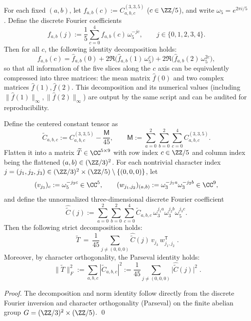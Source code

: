 \begin{remark}\label{prop:arity-335-fourier-fingerprint}
For each fixed $(a,b)$, let $f_{a,b}(c):=C^{(3,3,5)}_{a,b,c}$ ($c\in\ZZ/5$), and write $\omega_5=e^{2\pi i/5}$. Define the discrete Fourier coefficients
\[
\widehat f_{a,b}(j):=\frac15\sum_{c=0}^{4} f_{a,b}(c)\,\omega_5^{-jc},
\qquad j\in\{0,1,2,3,4\}.
\]
Then for all $c$, the following identity decomposition holds:
\[
f_{a,b}(c)
=\widehat f_{a,b}(0)
+2\Re\bigl(\widehat f_{a,b}(1)\,\omega_5^{c}\bigr)
+2\Re\bigl(\widehat f_{a,b}(2)\,\omega_5^{2c}\bigr),
\]
so that all information of the five slices along the $c$ axis can be equivalently compressed into three matrices: the mean matrix $\widehat f(0)$ and two complex matrices $\widehat f(1),\widehat f(2)$. This decomposition and its numerical values (including $\|\widehat f(1)\|_\infty,\|\widehat f(2)\|_\infty$) are output by the same script and can be audited for reproducibility.
\end{remark}

\begin{theorem}[Character decomposition \texorpdfstring{$\Rightarrow$}{=>} low-rank mechanism: rank-one outer product decomposition and Parseval energy identity for \texorpdfstring{$((3,3,5))$}{(3,3,5)}]\label{thm:arity-335-character-energy}
Define the centered constant tensor as
\[
\widetilde C_{a,b,c}:=C^{(3,3,5)}_{a,b,c}-\frac{\mathsf{M}}{45},
\qquad
\mathsf{M}:=\sum_{a=0}^2\sum_{b=0}^2\sum_{c=0}^4 C^{(3,3,5)}_{a,b,c}.
\]
Flatten it into a matrix \(\widetilde T\in\CC^{5\times 9}\) with row index \(c\in\ZZ/5\) and column index being the flattened \((a,b)\in(\ZZ/3)^2\).
For each nontrivial character index \(j=(j_1,j_2,j_3)\in(\ZZ/3)^2\times(\ZZ/5)\setminus\{(0,0,0)\}\), let
\[
(v_{j_3})_c:=\omega_5^{-j_3 c}\in\CC^{5},
\qquad
(w_{j_1,j_2})_{(a,b)}:=\omega_3^{-j_1 a}\omega_3^{-j_2 b}\in\CC^{9},
\]
and define the unnormalized three-dimensional discrete Fourier coefficient
\[
\widehat{\widetilde C}(j)
:=
\sum_{a=0}^2\sum_{b=0}^2\sum_{c=0}^4
\widetilde C_{a,b,c}\,\omega_3^{j_1 a}\omega_3^{j_2 b}\omega_5^{j_3 c}.
\]
Then the following strict decomposition holds:
\[
\boxed{\;
\widetilde T
\ =\
\frac{1}{45}\sum_{j\neq(0,0,0)}
\widehat{\widetilde C}(j)\,v_{j_3}\,w_{j_1,j_2}^{\mathsf T}\; }.
\]
Moreover, by character orthogonality, the Parseval identity holds:
\[
\boxed{\;
\|\widetilde T\|_F^2
:=
\sum_{a,b,c}|\widetilde C_{a,b,c}|^2
:=
\frac{1}{45}\sum_{j\neq(0,0,0)}\bigl|\widehat{\widetilde C}(j)\bigr|^2\; }.
\]
\end{theorem}
\begin{proof}
The decomposition and norm identity follow directly from the discrete Fourier inversion and character orthogonality (Parseval) on the finite abelian group \(G=(\ZZ/3)^2\times(\ZZ/5)\). \qed
\end{proof}

